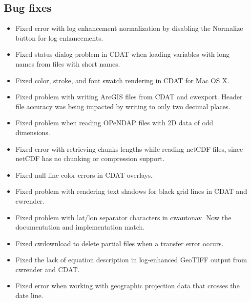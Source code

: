 \subsection*{Bug fixes}
\begin{itemize}

  \item Fixed error with log enhancement normalization by
  disabling the Normalize button for log enhancements.

  \item Fixed status dialog problem in CDAT when loading
  variables with long names from files with short names.

  \item Fixed color, stroke, and font swatch rendering in CDAT
  for Mac OS X.

  \item Fixed problem with writing ArcGIS files from CDAT and
  cwexport.  Header file accuracy was being impacted by writing
  to only two decimal places.

  \item Fixed problem when reading OPeNDAP files with 2D data of
  odd dimensions.

  \item Fixed error with retrieving chunks lengths while reading
  netCDF files, since netCDF has no chunking or compression
  support.
  
  \item Fixed null line color errors in CDAT overlays.

  \item Fixed problem with rendering text shadows for black grid
  lines in CDAT and cwrender.

  \item Fixed problem with lat/lon separator characters in
  cwautonav.  Now the documentation and implementation match.

  \item Fixed cwdownload to delete partial files when a transfer
  error occurs.

  \item Fixed the lack of equation description in log-enhanced
  GeoTIFF output from cwrender and CDAT.

  \item Fixed error when working with geographic projection data
  that crosses the date line.

\end{itemize}




